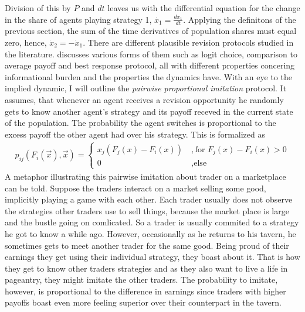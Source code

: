 \documentclass[11pt]{article}
\begin{document}
Division of this by $P$ and $dt$ leaves us with the differential equation for
the change in the share of agents playing strategy 1, 
$\dot{x_1} =\frac{dx_1}{dt}$. 
Applying the definitons  of the previous section,
the sum of the time derivatives of population shares must equal zero, hence,
$\dot{x}_2 =  - \dot{x}_1$.
There are different plausible revision protocols studied in the literature. 
\textcite[128,129,178]{sandholm_population_2010} discusses various forms of 
them such as logit choice, comparison to average payoff and best response 
protocol, all with different properties concering informational burden and the
properties the dynamics have. With an eye to the implied dynamic, I will
outline the \textit{pairwise proportional imitation} protocol. 
It assumes, that whenever an
agent receives a revision opportunity he randomly gets to know another agent's
strategy and its payoff receved in the current state of the population. 
The probability the agent switches is proportional to the excess payoff the 
other agent had over his strategy. This is formalized as 
\begin{align}
        \label{eq:pairwiseproportionalimitiation}
        p_{ij}(F_i(\vec{x}),\vec{x}) =
                \begin{cases}
                        x_j(F_j(x) -F_i(x)) &\ , \text{for } F_j(x) - F_i(x) > 0 \\
                        0 &\ , \text{else}
                \end{cases}
\end{align}
A metaphor illustrating this pairwise imitation about trader on a marketplace
can be told. Suppose the traders interact on a market selling some 
good, implicitly playing a game with each other. Each trader usually does not
observe the strategies other traders use to sell things, because the market
place is large and the bustle going on comlicated. 
So a trader is usually commited to a strategy he got to know a while ago.
However, occasionally as he returns to his tavern, he sometimes gets to meet 
another trader for the same good. Being proud of their earnings they get using
their individual strategy, they boast about it. That is how they get to know
other traders strategies and as they also want to live a life in pageantry,
they might imitate the other traders. The probability to imitate, however, is
proportional to the difference in earnings since traders with higher payoffs 
boast even more feeling superior over their counterpart in the tavern.
\end{document}
